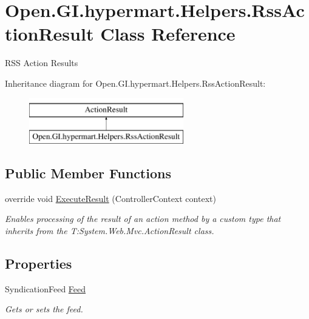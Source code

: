 \hypertarget{class_open_1_1_g_i_1_1hypermart_1_1_helpers_1_1_rss_action_result}{}\section{Open.\+G\+I.\+hypermart.\+Helpers.\+Rss\+Action\+Result Class Reference}
\label{class_open_1_1_g_i_1_1hypermart_1_1_helpers_1_1_rss_action_result}


R\+SS Action Results  


Inheritance diagram for Open.\+G\+I.\+hypermart.\+Helpers.\+Rss\+Action\+Result\+:\begin{figure}[H]
\begin{center}
\leavevmode
\includegraphics[height=2.000000cm]{class_open_1_1_g_i_1_1hypermart_1_1_helpers_1_1_rss_action_result}
\end{center}
\end{figure}
\subsection*{Public Member Functions}
\begin{DoxyCompactItemize}
\item 
override void \hyperlink{class_open_1_1_g_i_1_1hypermart_1_1_helpers_1_1_rss_action_result_a18ff30f679b2858b2d88a7dc267fd672}{Execute\+Result} (Controller\+Context context)
\begin{DoxyCompactList}\small\item\em Enables processing of the result of an action method by a custom type that inherits from the T\+:\+System.\+Web.\+Mvc.\+Action\+Result class. \end{DoxyCompactList}\end{DoxyCompactItemize}
\subsection*{Properties}
\begin{DoxyCompactItemize}
\item 
Syndication\+Feed \hyperlink{class_open_1_1_g_i_1_1hypermart_1_1_helpers_1_1_rss_action_result_a3b07cc4558b6a4863821fbedd9aa6888}{Feed}
\begin{DoxyCompactList}\small\item\em Gets or sets the feed. \end{DoxyCompactList}\end{DoxyCompactItemize}


